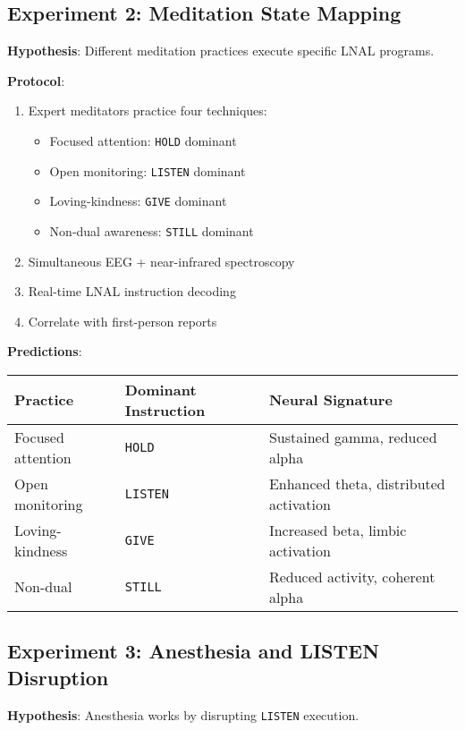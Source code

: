 \documentclass[12pt,a4paper]{article}
\newcommand{\opcmd}[1]{\texttt{#1}}
\begin{document}
\subsection{Experiment 2: Meditation State Mapping}

\textbf{Hypothesis}: Different meditation practices execute specific LNAL programs.

\textbf{Protocol}:
\begin{enumerate}
\item Expert meditators practice four techniques:
   \begin{itemize}
   \item Focused attention: \opcmd{HOLD} dominant
   \item Open monitoring: \opcmd{LISTEN} dominant
   \item Loving-kindness: \opcmd{GIVE} dominant
   \item Non-dual awareness: \opcmd{STILL} dominant
   \end{itemize}
\item Simultaneous EEG + near-infrared spectroscopy
\item Real-time LNAL instruction decoding
\item Correlate with first-person reports
\end{enumerate}

\textbf{Predictions}:
\begin{table}[H]
\centering
\begin{tabular}{lll}
\toprule
\textbf{Practice} & \textbf{Dominant Instruction} & \textbf{Neural Signature} \\
\midrule
Focused attention & \opcmd{HOLD} & Sustained gamma, reduced alpha \\
Open monitoring & \opcmd{LISTEN} & Enhanced theta, distributed activation \\
Loving-kindness & \opcmd{GIVE} & Increased beta, limbic activation \\
Non-dual & \opcmd{STILL} & Reduced activity, coherent alpha \\
\bottomrule
\end{tabular}
\end{table}

\subsection{Experiment 3: Anesthesia and LISTEN Disruption}

\textbf{Hypothesis}: Anesthesia works by disrupting \opcmd{LISTEN} execution.
\end{document}
